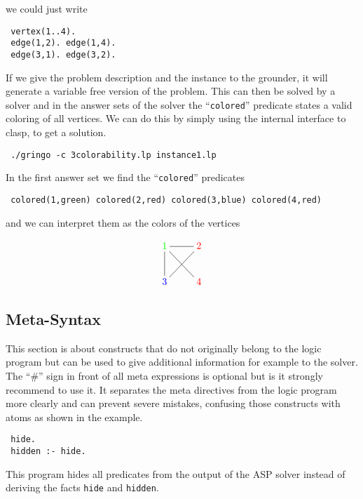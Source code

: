 \documentclass[a4paper,10pt]{article}
\begin{document}
we could just write
\begin{verbatim}
 vertex(1..4).
 edge(1,2). edge(1,4).
 edge(3,1). edge(3,2).
\end{verbatim}

If we give the problem description and the instance to the grounder, it will generate a variable free version of the problem. This can then be solved by a solver and in the answer sets of the solver the ``\texttt{colored}'' predicate states a valid coloring of all vertices.
We can do this by simply using the internal interface to clasp, to get a solution.
\begin{verbatim}
 ./gringo -c 3colorability.lp instance1.lp
\end{verbatim}
In the first answer set we find the ``\texttt{colored}'' predicates
\begin{verbatim}
 colored(1,green) colored(2,red) colored(3,blue) colored(4,red)
\end{verbatim}
and we can interpret them as the colors of the vertices
 
\[
 \xymatrix{\color{green}1\ar@{-}[dr]\ar@{-}[d]\ar@{-}[r]&\color{red}2\ar@{-}[dl]\\
           \color{blue}3&\color{red}4}
\]

\subsection{Meta-Syntax}
This section is about constructs that do not originally belong to the logic program but can be used to give additional information for example to the solver.
The ``\#'' sign in front of all meta expressions is optional but is it strongly recommend to use it.
It separates the meta directives from the logic program more clearly and can prevent severe mistakes,
 confusing those constructs with atoms as shown in the example.
\begin{verbatim}
 hide.
 hidden :- hide.
\end{verbatim}
This program hides all predicates from the output of the ASP solver instead of deriving the facts \texttt{hide} and \texttt{hidden}.
\end{document}
